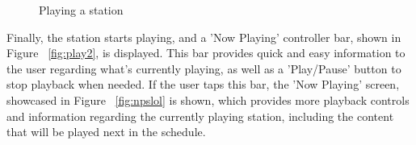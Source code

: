 \begin{figure}[htbp]
	\centering
	 \qquad
	 \qquad
	\caption{Playing a station}
	\label{fig:mfp1}
\end{figure}

\newpage

Finally, the station starts playing, and a 'Now Playing' controller bar, shown in Figure ~\ref{fig:play2}, is displayed. This bar provides quick and easy information to the user regarding what's currently playing, as well as a 'Play/Pause' button to stop playback when needed. If the user taps this bar, the 'Now Playing' screen, showcased in Figure ~\ref{fig:npslol} is shown, which provides more playback controls and information regarding the currently playing station, including the content that will be played next in the schedule.

